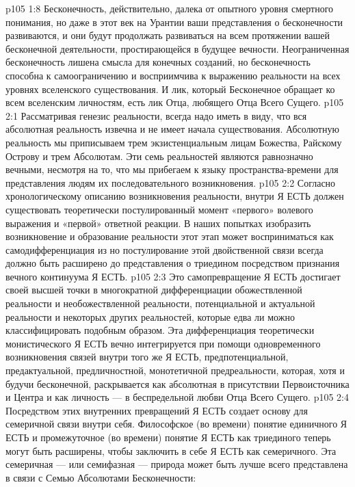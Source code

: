 \vs p105 1:8 Бесконечность, действительно, далека от опытного уровня смертного понимания, но даже в этот век на Урантии ваши представления о бесконечности развиваются, и они будут продолжать развиваться на всем протяжении вашей бесконечной деятельности, простирающейся в будущее вечности. Неограниченная бесконечность лишена смысла для конечных созданий, но бесконечность способна к самоограничению и восприимчива к выражению реальности на всех уровнях вселенского существования. И лик, который Бесконечное обращает ко всем вселенским личностям, есть лик Отца, любящего Отца Всего Сущего.
\vs p105 2:1 Рассматривая генезис реальности, всегда надо иметь в виду, что вся абсолютная реальность извечна и не имеет начала существования. Абсолютную реальность мы приписываем трем экзистенциальным лицам Божества, Райскому Острову и трем Абсолютам. Эти семь реальностей являются равнозначно вечными, несмотря на то, что мы прибегаем к языку пространства\hyp{}времени для представления людям их последовательного возникновения.
\vs p105 2:2 \pc Согласно хронологическому описанию возникновения реальности, внутри Я ЕСТЬ должен существовать теоретически постулированный момент «первого» волевого выражения и «первой» ответной реакции. В наших попытках изобразить возникновение и образование реальности этот этап может восприниматься как самодифференциация  из  но постулирование этой двойственной связи всегда должно быть расширено до представления о триедином посредством признания вечного континуума  Я ЕСТЬ.
\vs p105 2:3 Это самопревращение Я ЕСТЬ достигает своей высшей точки в многократной дифференциации обожествленной реальности и необожествленной реальности, потенциальной и актуальной реальности и некоторых других реальностей, которые едва ли можно классифицировать подобным образом. Эта дифференциация теоретически монистического Я ЕСТЬ вечно интегрируется при помощи одновременного возникновения связей внутри того же Я ЕСТЬ, предпотенциальной, предактуальной, предличностной, монотетичной предреальности, которая, хотя и будучи бесконечной, раскрывается как абсолютная в присутствии Первоисточника и Центра и как личность --- в беспредельной любви Отца Всего Сущего.
\vs p105 2:4 Посредством этих внутренних превращений Я ЕСТЬ создает основу для семеричной связи внутри себя. Философское (во времени) понятие единичного Я ЕСТЬ и промежуточное (во времени) понятие Я ЕСТЬ как триединого теперь могут быть расширены, чтобы заключить в себе Я ЕСТЬ как семеричного. Эта семеричная --- или семифазная --- природа может быть лучше всего представлена в связи с Семью Абсолютами Бесконечности:
